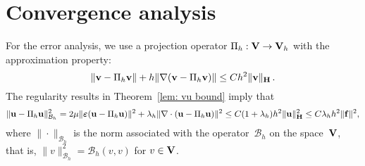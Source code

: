 \documentclass[11pt]{article}
\newcommand{\calB}{\mathcal{B}}
\newcommand{\vf}{{\bf f}}
\newcommand{\vu}{{\bf u}}
\newcommand{\vv}{{\bf v}}
\newcommand{\vV}{{\bf V}}
\numberwithin{equation}{section}
\newcommand{\veps}{{\boldsymbol{\varepsilon}}}
\begin{document}
\section{Convergence analysis}\label{ConvAna}
For the error analysis, we use a projection operator $\Pi_h: \vV \to \vV_h$ with
the approximation property:
\begin{equation}
    \label{projection estimate}\|\vv-\Pi_h \vv\|+h\|\nabla (\vv-\Pi_h \vv)\| \le C h^2 \|\vv\|_{\bf H}\,.
    \end{equation}
The regularity results in Theorem~\ref{lem: vu bound} imply that
\begin{equation}\label{projection estimate Bh}
\|\vu-\Pi_h \vu\|_{\calB_h}^2=2\mu\|\veps(\vu-\Pi_h \vu)\|^2
     +\lambda_h\|\nabla \cdot (\vu-\Pi_h \vu)\|^2
     \le C(1+\lambda_h) h^2 \|\vu\|_{\bf H}^2
      \le  C\lambda_h h^2 \|\vf\|^2,
\end{equation}
where $\|\cdot\|_{\calB_h}$ is the norm associated with the operator~$\calB_h$
on the space~$\vV$, that is, $\|v\|_{\calB_h}^2=\calB_h(v,v)$ for $v\in\vV$.
\end{document}
